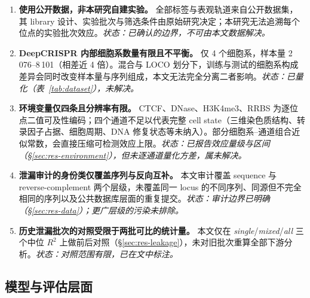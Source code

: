 \begin{enumerate}
\item \textbf{使用公开数据，非本研究自建实验。} 全部标签与表观轨道来自公开数据集\citep{Chuai2018GenomeBiol,Hiranniramol2020Bioinformatics,Labuhn2018NAR}，其 library 设计、实验批次与筛选条件由原始研究决定；本研究无法追溯每个位点的实验批次效应。\emph{状态：已确认的边界，不可由本文数据解决。}
\item \textbf{DeepCRISPR 内部细胞系数量有限且不平衡。} 仅 4 个细胞系，样本量 2\,076--8\,101（相差近 4 倍）。混合与 LOCO 划分下，训练与测试的细胞系构成差异会同时改变样本量与序列组成，本文无法完全分离二者影响。\emph{状态：已量化（表~\ref{tab:dataset}），未解决。}
\item \textbf{环境变量仅四条且分辨率有限。} CTCF、DNase、H3K4me3、RRBS 为逐位点二值可及性编码；四个通道不足以代表完整 cell state（三维染色质结构、转录因子占据、细胞周期、DNA 修复状态等未纳入）。部分细胞系--通道组合近似常数，会直接压缩可检测效应上限。\emph{状态：已报告效应量级与区间（\S\ref{sec:res-environment}），但未逐通道量化方差，属未解决。}
\item \textbf{泄漏审计的身份类仅覆盖序列与反向互补。} 本文审计覆盖 sequence 与 reverse-complement 两个层级，未覆盖同一 locus 的不同序列、同源但不完全相同的序列以及公共数据库层面的重复提交。\emph{状态：审计边界已明确（\S\ref{sec:res-data}）；更广层级的污染未排除。}
\item \textbf{历史泄漏批次的对照受限于两批可比的统计量。} 本文仅在 \emph{single}/\emph{mixed}/\emph{all} 三个中位 $R^{2}$ 上做前后对照（\S\ref{sec:res-leakage}），未对旧批次重算全部下游分析。\emph{状态：对照范围有限，已在文中标注。}
\end{enumerate}

\subsection{模型与评估层面}

